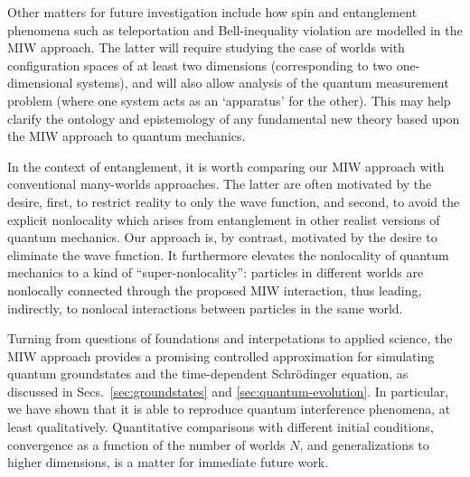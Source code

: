 \documentclass[twocolumn,aps,pra,amsmath,amssymb,superscriptaddress]{revtex4}
\renewcommand{\(}{\left(}
\renewcommand{\)}{\right)}
\newcommand{\blk}{\color{black}}
\newcommand{\blu}{\color{blue}}
\renewcommand\blu{\blk}
\begin{document}
Other matters for future investigation include   how spin and   entanglement
\blu phenomena such as teleportation and Bell-inequality violation \blk are
modelled in the
MIW approach. The latter \blk will require studying the case of worlds with configuration
spaces of at least two dimensions (corresponding to two one-dimensional
systems), and will also allow analysis of the quantum measurement problem (where
one system acts as an `apparatus' for the other). This may help clarify 
the ontology and epistemology of any fundamental new theory based upon
the MIW approach to quantum mechanics. \blk 

In the context of entanglement, it is worth comparing our MIW approach with 
conventional  many-worlds approaches. The latter  are often motivated by the desire,
first,  to restrict reality to only the wave function, and second, to avoid the 
explicit nonlocality which arises from entanglement \blk in other realist versions of quantum mechanics. Our
approach is, by  contrast,   motivated by the desire to 
eliminate the wave function.  It  furthermore
elevates the  nonlocality of quantum mechanics to a kind of
``super-nonlocality'':  particles in different worlds are nonlocally connected through the proposed MIW interaction, thus leading, indirectly, to  nonlocal interactions between particles in the same world. 
\blk

 Turning from questions of foundations and interpetations to applied science, 
the MIW approach  provides  a promising controlled
approximation for simulating \blk quantum groundstates and the time-dependent  Schr\"odinger equation, as
discussed in Secs.~\ref{sec:groundstates} and \ref{sec:quantum-evolution}. 
In particular, we have shown that it is able to reproduce quantum interference phenomena, 
at least qualitatively. Quantitative comparisons with different initial conditions,  convergence as a function of
 the number of worlds  $N$, and generalizations to higher dimensions, is a matter for 
immediate  future work. 
\end{document}
